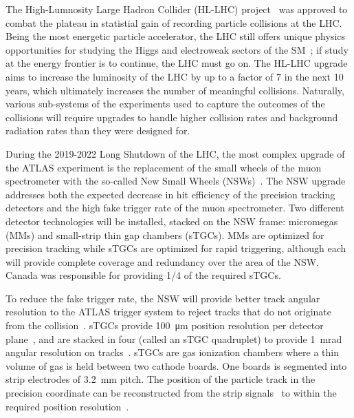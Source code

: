The High-Lumnosity Large Hadron Collider (HL-LHC) project~\cite{hl_lhc_tdr} was approved to combat the plateau in statistial gain of recording particle collisions at the LHC. Being the most energetic particle accelerator, the LHC still offers unique physics opportunities for studying the Higgs and electroweak sectors of the SM~\cite{dainese_physics_2018}; if study at the energy frontier is to continue, the LHC must go on. The HL-LHC upgrade aims to increase the luminosity of the LHC by up to a factor of 7 in the next 10 years, which ultimately increases the number of meaningful collisions. Naturally, various sub-systems of the experiments used to capture the outcomes of the collisions will require upgrades to handle higher collision rates and background radiation rates than they were designed for. 

During the 2019-2022 Long Shutdown of the LHC, the most complex upgrade of the ATLAS experiment is the replacement of the small wheels of the muon spectrometer with the so-called New Small Wheels (NSWs)~\cite{nsw_tdr}. The NSW upgrade addresses both the expected decrease in hit efficiency of the precision tracking detectors and the high fake trigger rate of the muon spectrometer. Two different detector technologies will be installed, stacked on the NSW frame: micromegas (MMs) and small-strip thin gap chambers (sTGCs). MMs are optimized for precision tracking while sTGCs are optimized for rapid triggering, although each will provide complete coverage and redundancy over the area of the NSW. Canada was responsible for providing 1/4 of the required sTGCs.

To reduce the fake trigger rate, the NSW will provide better track angular resolution to the ATLAS trigger system to reject tracks that do not originate from the collision~\cite{nsw_tdr}. sTGCs provide \SI{100}{\micro\meter} position resolution per detector plane~\cite{abusleme_performance_2016}, and are stacked in four (called an sTGC quadruplet) to provide \SI{1}{mrad} angular resolution on tracks~\cite{nsw_tdr, perez-codina_small-strip_2016}. sTGCs are gas ionization chambers where a thin volume of gas is held between two cathode boards. One boards is segmented into strip electrodes of \SI{3.2}{mm} pitch. The position of the particle track in the precision coordinate can be reconstructed from the strip signals~\cite{nsw_tdr} to within the required position resolution~\cite{abusleme_performance_2016}.

